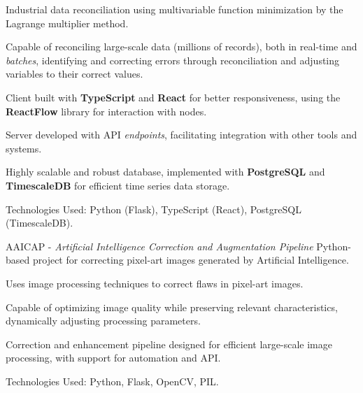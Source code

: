       \resumeItemListStart
        \item Industrial data reconciliation using multivariable function minimization by the Lagrange multiplier method.
        \item {Capable of reconciling large-scale data (millions of records), both in real-time and \textit{batches}, identifying and correcting errors through reconciliation and adjusting variables to their correct values.}
        \item {Client built with \textbf{TypeScript} and \textbf{React} for better responsiveness, using the \textbf{ReactFlow} library for interaction with nodes.}
        \item {Server developed with API \textit{endpoints}, facilitating integration with other tools and systems.}
        \item {Highly scalable and robust database, implemented with \textbf{PostgreSQL} and \textbf{TimescaleDB} for efficient time series data storage.}
        \item {Technologies Used: Python (Flask), TypeScript (React), PostgreSQL (TimescaleDB).}
      \resumeItemListEnd

       \resumeProject
      { AAICAP - \textit{Artificial Intelligence Correction and Augmentation Pipeline}}
      {Python-based project for correcting pixel-art images generated by Artificial Intelligence.}
      {}

      \resumeItemListStart
        \item {Uses image processing techniques to correct flaws in pixel-art images.}
        \item {Capable of optimizing image quality while preserving relevant characteristics, dynamically adjusting processing parameters.}
        \item {Correction and enhancement pipeline designed for efficient large-scale image processing, with support for automation and API.}
        
        \item {Technologies Used: Python, Flask, OpenCV, PIL.}
      \resumeItemListEnd
      
  \resumeSubHeadingListEnd
\vspace{-8.5mm}

